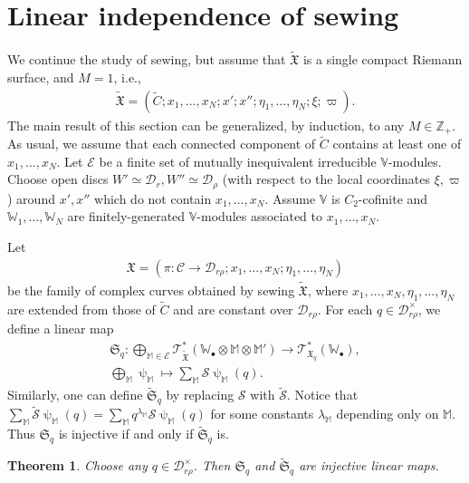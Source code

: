 \documentclass[12pt,b5paper,notitlepage]{report}
\theoremstyle{definition}
\theoremstyle{plain}
\newtheorem{thm}[df]{Theorem}
\newcommand{\fk}{\mathfrak}
\newcommand{\mc}{\mathcal}
\newcommand{\wtd}{\widetilde}
\newcommand{\scr}{\mathscr}
\newcommand{\blt}{\bullet}
\newcommand{\Vbb}{\mathbb V}
\newcommand{\Wbb}{\mathbb W}
\newcommand{\Mbb}{\mathbb M}
\newcommand{\Zbb}{\mathbb Z}
\numberwithin{equation}{section}
\begin{document}
\section{Linear independence of sewing}\label{lb104}

We continue the study of sewing, but assume that $\wtd{\fk X}$ is a single compact Riemann surface, and $M=1$, i.e.,
\begin{align*}
\wtd{\fk X}=(\wtd C;x_1,\dots,x_N;x';x'';\eta_1,\dots,\eta_N;\xi;\varpi).
\end{align*}
The main result of this section can be generalized, by induction, to any $M\in\Zbb_+$. As usual, we assume that each connected component of $\wtd C$ contains at least one of $x_1,\dots,x_N$. Let $\mc E$ be a finite set of mutually inequivalent irreducible $\Vbb$-modules. Choose open discs $W'\simeq \mc D_r,W''\simeq\mc D_\rho$ (with respect to the local coordinates $\xi,\varpi$) around $x',x''$ which do not contain $x_1,\dots,x_N$. Assume $\Vbb$ is $C_2$-cofinite and $\Wbb_1,\dots,\Wbb_N$ are finitely-generated $\Vbb$-modules associated to $x_1,\dots,x_N$. 

Let
\begin{align*}
\fk X=(\pi:\mc C\rightarrow\mc D_{r\rho};x_1,\dots,x_N;\eta_1,\dots,\eta_N)
\end{align*}
be the family of complex curves obtained by sewing $\wtd{\fk X}$, where $x_1,\dots,x_N,\eta_1,\dots,\eta_N$ are extended from those of $\wtd C$ and are constant over $\mc D_{r\rho}$. For each $q\in\mc D_{r\rho}^\times$, we define a linear map
\begin{gather}
\fk S_q:\bigoplus_{\Mbb\in\mc E}\scr T_{\wtd{\fk X}}^*(\Wbb_\blt\otimes\Mbb\otimes\Mbb')\rightarrow\scr T_{\fk X_q}^*(\Wbb_\blt),\label{eq191}\\
\bigoplus_\Mbb\uppsi_\Mbb\mapsto \sum_\Mbb\mc S\uppsi_\Mbb(q).\nonumber
\end{gather}
Similarly, one can define $\wtd{\fk S}_q$ by replacing $\mc S$ with $\wtd{\mc S}$. Notice that $\sum_\Mbb\wtd{\mc S}\uppsi_\Mbb(q)=\sum_\Mbb q^{\lambda_\Mbb}\mc S\uppsi_\Mbb(q)$ for some constants $\lambda_\Mbb$ depending only on $\Mbb$. Thus $\fk S_q$ is injective if and only if $\wtd{\fk S}_q$ is.


\begin{thm}\label{lb114}
Choose any $q\in\mc D_{r\rho}^\times$. Then $\fk S_q$ and $\wtd{\fk S}_q$ are injective linear maps.
\end{thm}
\end{document}

